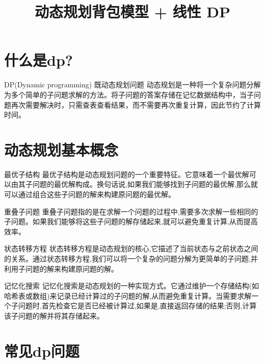\documentclass{beamer}
\title{动态规划背包模型 + 线性 DP}
\author{}
\date{}
\begin{document}
\frame{\titlepage}

\section{什么是dp?}

\begin{frame}{DP(Dynamic programming) 既动态规划问题}
    动态规划是一种将一个复杂问题分解为多个简单的子问题求解的方法。将子问题的答案存储在记忆数据结构中，当子问题再次需要解决时，只需查表查看结果，而不需要再次重复计算，因此节约了计算时间。
\end{frame}

\section{动态规划基本概念}

\begin{frame}{最优子结构}
    最优子结构是动态规划问题的一个重要特征。它意味着一个最优解可以由其子问题的最优解构成。换句话说,如果我们能够找到子问题的最优解,那么就可以通过组合这些子问题的解来构建原问题的最优解。
\end{frame}

\begin{frame}{重叠子问题}
    重叠子问题指的是在求解一个问题的过程中,需要多次求解一些相同的子问题。如果我们能够将这些子问题的解存储起来,就可以避免重复计算,从而提高效率。
\end{frame}

\begin{frame}{状态转移方程}
    状态转移方程是动态规划的核心,它描述了当前状态与之前状态之间的关系。通过状态转移方程,我们可以将一个复杂的问题分解为更简单的子问题,并利用子问题的解来构建原问题的解。
\end{frame}

\begin{frame}{记忆化搜索}
    记忆化搜索是动态规划的一种实现方式。它通过维护一个存储结构(如哈希表或数组)来记录已经计算过的子问题的解,从而避免重复计算。当需要求解一个子问题时,首先检查它是否已经被计算过,如果是,直接返回存储的结果;否则,计算该子问题的解并将其存储起来。
\end{frame}

\section{常见dp问题}
\end{document}
